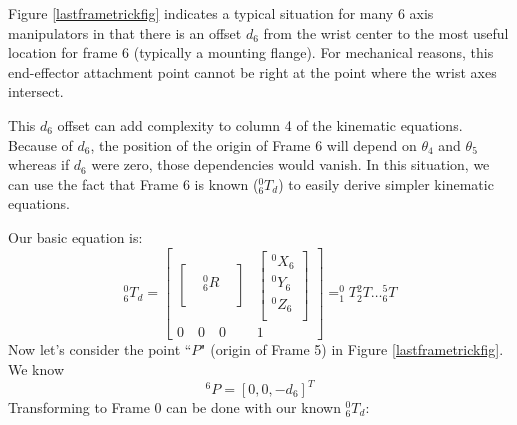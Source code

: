 Figure \ref{lastframetrickfig} indicates a typical situation for many 6 axis manipulators in that 
there is an offset $d_6$ from the wrist center to the most useful location for frame 6 (typically 
a mounting flange).   For mechanical reasons, this end-effector attachment point cannot be right
at the point where the wrist axes intersect. 

This $d_6$ offset can add complexity to column 4 of the kinematic equations.   Because of $d_6$,
the position of the origin of Frame 6 will depend on $\theta_4$ and $\theta_5$ whereas if $d_6$ 
were zero, those dependencies would vanish.   In this situation, we can use the fact that Frame 6 is
known ($^0_6T_d$) to easily derive simpler kinematic equations.

Our basic equation is:
\[
^0_6T_d =
\begin{bmatrix}
\begin{bmatrix}  &  &  \\  & ^0_6R&  \\ & & \\ \end{bmatrix}      &
 \begin{bmatrix} ^0X_6 \\ ^0Y_6  \\ ^0Z_6 \\ \end{bmatrix}            \\
 0 \quad 0 \quad 0      &   1
\end{bmatrix} =
^0_1T{^2_2T}\dots{^5_6T}
\]
Now let's consider the point ``$P$" (origin of Frame 5) in Figure \ref{lastframetrickfig}.  We know 
\[
^6P = [0,0,-d_6]^T
\]
Transforming to Frame 0 can be done with our known $^0_6T_d$:

